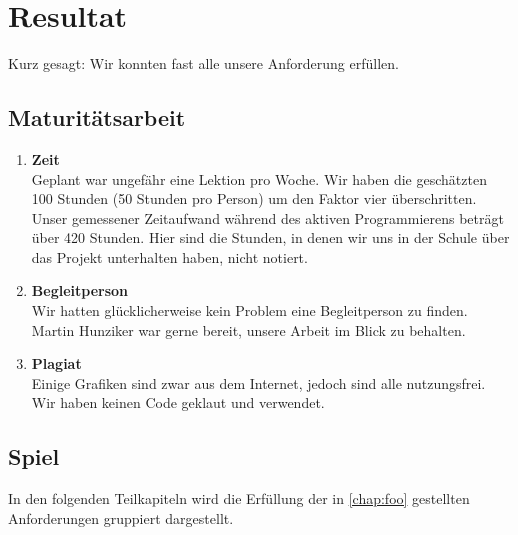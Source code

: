 

\renewcommand{\figurename}{Abb.}

\chapter{Resultat}
Kurz gesagt: Wir konnten fast alle unsere Anforderung erfüllen.

\section{Maturitätsarbeit}
\begin{enumerate}
    \item \textbf{Zeit} \\
        Geplant war ungefähr eine Lektion pro Woche. Wir haben die geschätzten 100 Stunden (50 Stunden pro Person) um den Faktor vier überschritten. Unser gemessener Zeitaufwand während des aktiven Programmierens
        beträgt über 420 Stunden. Hier sind die Stunden, in denen wir uns in der Schule über das Projekt unterhalten haben, nicht notiert.
    \item \textbf{Begleitperson} \\
        Wir hatten glücklicherweise kein Problem eine Begleitperson zu finden. Martin Hunziker war gerne bereit, unsere Arbeit im Blick zu behalten.
    \item \textbf{Plagiat} \\
        Einige Grafiken sind zwar aus dem Internet, jedoch sind alle nutzungsfrei. Wir haben keinen Code geklaut und verwendet. 
\end{enumerate}

\section{Spiel}
In den folgenden Teilkapiteln wird die Erfüllung der in \autoref{chap:foo} gestellten Anforderungen gruppiert dargestellt. 
